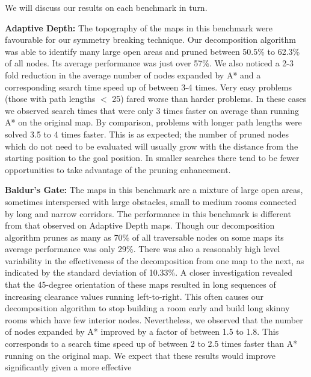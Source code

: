 We will discuss our results on each benchmark in turn.

\textbf{Adaptive Depth:} 
The topography of the maps in this benchmark were favourable for our
symmetry breaking technique.
Our decomposition algorithm was able to identify many large open areas and
pruned between 50.5\% to 62.3\% of all nodes.
Its average performance was just over 57\%. 
We also noticed a 2-3 fold reduction in the average number of nodes expanded 
by A* and a corresponding search time speed up of between 3-4 times.
Very easy problems (those with path lengths $<$ 25) fared worse than harder
problems. 
In these cases we observed search times that were only 3 times faster on average 
than running A* on the original map. 
By comparison, problems with longer path lengths were solved 3.5 to 4 times faster.
This is as expected; the number of pruned nodes which do not need to be evaluated
will usually grow with the distance from the starting position to the goal
position. In smaller searches there tend to be fewer opportunities to take advantage 
of the pruning enhancement.
%
\par
\textbf{Baldur's Gate: }
The maps in this benchmark are a mixture of large open areas, sometimes
interspersed with large obstacles, small to medium rooms connected
by long and narrow corridors.
The performance in this benchmark is different from that observed on Adaptive Depth maps.
Though our decomposition algorithm prunes as many as 70\% of all traversable nodes 
on some maps its average performance was only 29\%. 
There was also a reasonably high level variability in the effectiveness of the 
decomposition from one map to the next, as indicated by the standard deviation
of 10.33\%.
A closer investigation revealed that the 45-degree orientation of these maps
resulted in long sequences of increasing clearance values running left-to-right.
This often causes our decomposition algorithm to stop building a room early and build long
skinny rooms which have few interior nodes.
Nevertheless, we observed that the number of nodes expanded by A* improved by a
factor of between 1.5 to 1.8. This corresponds to a search time speed up of between
2 to 2.5 times faster than A* running on the original map.
We expect that these results would improve significantly given a more effective
